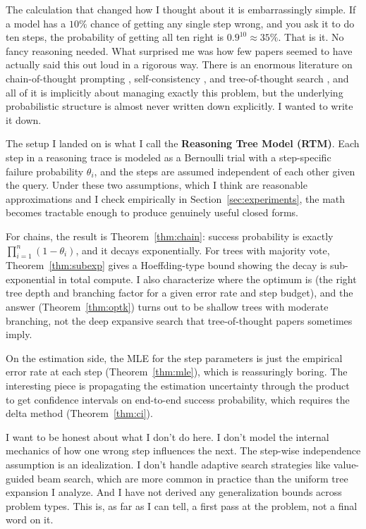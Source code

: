 \documentclass[11pt]{article}
\theoremstyle{plain}
\theoremstyle{definition}
\begin{document}
The calculation that changed how I thought about it is embarrassingly simple.
If a model has a $10\%$ chance of getting any single step wrong, and you ask it
to do ten steps, the probability of getting all ten right is $0.9^{10} \approx
35\%$. That is it. No fancy reasoning needed. What surprised me was how few
papers seemed to have actually said this out loud in a rigorous way. There is an
enormous literature on chain-of-thought prompting \citep{wei2022chain,
kojima2022large}, self-consistency \citep{wang2022self}, and tree-of-thought
search \citep{yao2023tree}, and all of it is implicitly about managing exactly
this problem, but the underlying probabilistic structure is almost never written
down explicitly. I wanted to write it down.

The setup I landed on is what I call the \textbf{Reasoning Tree Model (RTM)}.
Each step in a reasoning trace is modeled as a Bernoulli trial with a
step-specific failure probability $\theta_i$, and the steps are assumed
independent of each other given the query. Under these two assumptions, which
I think are reasonable approximations and I check empirically in
Section~\ref{sec:experiments}, the math becomes tractable enough to produce
genuinely useful closed forms.

For chains, the result is Theorem~\ref{thm:chain}: success probability is
exactly $\prod_{i=1}^n(1-\theta_i)$, and it decays exponentially. For trees
with majority vote, Theorem~\ref{thm:subexp} gives a Hoeffding-type bound
showing the decay is sub-exponential in total compute. I also characterize
where the optimum is (the right tree depth and branching factor for a given
error rate and step budget), and the answer (Theorem~\ref{thm:optk}) turns
out to be shallow trees with moderate branching, not the deep expansive search
that tree-of-thought papers sometimes imply.

On the estimation side, the MLE for the step parameters is just the empirical
error rate at each step (Theorem~\ref{thm:mle}), which is reassuringly
boring. The interesting piece is propagating the estimation uncertainty through
the product to get confidence intervals on end-to-end success probability, which
requires the delta method (Theorem~\ref{thm:ci}).

I want to be honest about what I don't do here. I don't model the internal
mechanics of how one wrong step influences the next. The step-wise independence
assumption is an idealization. I don't handle adaptive search strategies like
value-guided beam search, which are more common in practice than the uniform
tree expansion I analyze. And I have not derived any generalization bounds
across problem types. This is, as far as I can tell, a first pass at the
problem, not a final word on it.
\end{document}
